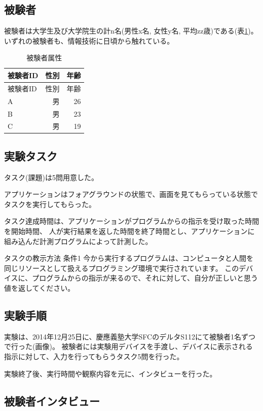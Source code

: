 \subsection{被験者}\label{ux88abux9a13ux8005}

被験者は大学生及び大学院生の計n名(男性x名, 女性y名,
平均zz歳)である(表\ref{table:tester})。
いずれの被験者も、情報技術に日頃から触れている。

\begin{longtable}[c]{@{}lrr@{}}
\caption{被験者属性 \label{table:tester}}\tabularnewline
\toprule
被験者ID & 性別 & 年齢\tabularnewline
\midrule
\endfirsthead
\toprule
被験者ID & 性別 & 年齢\tabularnewline
\midrule
\endhead
A & 男 & 26\tabularnewline
B & 男 & 23\tabularnewline
C & 男 & 19\tabularnewline
\bottomrule
\end{longtable}

\subsection{実験タスク}\label{ux5b9fux9a13ux30bfux30b9ux30af}

タスク(課題)は5問用意した。

アプリケーションはフォアグラウンドの状態で、画面を見てもらっている状態でタスクを実行してもらった。

タスク達成時間は、アプリケーションがプログラムからの指示を受け取った時間を開始時間、
人が実行結果を返した時間を終了時間とし、アプリケーションに組み込んだ計測プログラムによって計測した。

タスクの教示方法 条件1
今から実行するプログラムは、コンピュータと人間を同じリソースとして扱えるプログラミング環境で実行されています。
このデバイスに、プログラムからの指示が来るので、それに対して、自分が正しいと思う値を返してください。

\subsection{実験手順}\label{ux5b9fux9a13ux624bux9806}

実験は、2014年12月25日に、慶應義塾大学SFCのデルタS112にて被験者1名ずつで行った(画像)。
被験者には実験用デバイスを手渡し、デバイスに表示される指示に対して、入力を行ってもらうタスク5問を行った。

実験終了後、実行時間や観察内容を元に、インタビューを行った。

\subsection{被験者インタビュー}\label{ux88abux9a13ux8005ux30a4ux30f3ux30bfux30d3ux30e5ux30fc}

